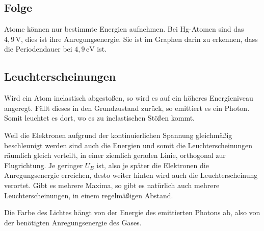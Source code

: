 \documentclass{article}
\newcommand{\uv}[0]{\,\text{V}}
\begin{document}
\subsection{Folge} 
Atome können nur bestimmte Energien aufnehmen. Bei Hg-Atomen sind das $4,9\uv$, dies ist ihre Anregungsenergie. Sie ist im Graphen darin zu erkennen, dass die Periodendauer bei $4,9\,\text{eV}$ ist.
 
\subsection{Leuchterscheinungen}
Wird ein Atom inelastisch abgestoßen, so wird es auf ein höheres Energieniveau angeregt. Fällt dieses in den Grundzustand zurück, so emittiert es ein Photon. Somit leuchtet es dort, wo es zu inelastischen Stößen kommt.
 
Weil die Elektronen aufgrund der kontinuierlichen Spannung gleichmäßig beschleunigt werden sind auch die Energien und somit die Leuchterscheinungen räumlich gleich verteilt, in einer ziemlich geraden Linie, orthogonal zur Flugrichtung. Je geringer $U_B$ ist, also je später die Elektronen die Anregungsenergie erreichen, desto weiter hinten wird auch die Leuchterscheinung verortet. \newline
Gibt es mehrere Maxima, so gibt es natürlich auch mehrere Leuchterscheinungen, in einem regelmäßigen Abstand.
 
Die Farbe des Lichtes hängt von der Energie des emittierten Photons ab, also von der benötigten Anregungsenergie des Gases. 
\end{document}
